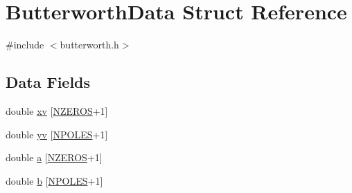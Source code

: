 \hypertarget{struct_butterworth_data}{\section{Butterworth\-Data Struct Reference}
\label{struct_butterworth_data}
}


{\ttfamily \#include $<$butterworth.\-h$>$}

\subsection*{Data Fields}
\begin{DoxyCompactItemize}
\item 
double \hyperlink{struct_butterworth_data_a8652f8de3a2de964a59307fe77d16ac1}{xv} \mbox{[}\hyperlink{butterworth_8h_af789ea380ca0d2f3b7728e2c8d04d342}{N\-Z\-E\-R\-O\-S}+1\mbox{]}
\item 
double \hyperlink{struct_butterworth_data_a8de2775fdf6eb85cee7e62025805efc0}{yv} \mbox{[}\hyperlink{butterworth_8h_a93bacc4ebd777fa5a548cba1305cdf4c}{N\-P\-O\-L\-E\-S}+1\mbox{]}
\item 
double \hyperlink{struct_butterworth_data_a557bf92bd5ff8e53a9e40f1181d2917f}{a} \mbox{[}\hyperlink{butterworth_8h_af789ea380ca0d2f3b7728e2c8d04d342}{N\-Z\-E\-R\-O\-S}+1\mbox{]}
\item 
double \hyperlink{struct_butterworth_data_ac7faaa2c57b21f5d19544214816c4d5e}{b} \mbox{[}\hyperlink{butterworth_8h_a93bacc4ebd777fa5a548cba1305cdf4c}{N\-P\-O\-L\-E\-S}+1\mbox{]}
\end{DoxyCompactItemize}


